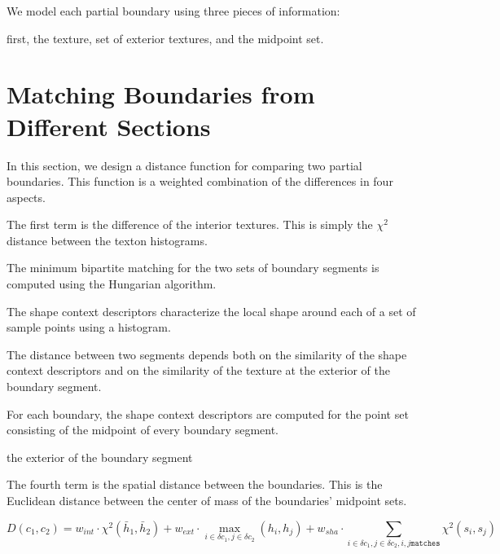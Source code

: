 \documentclass{llncs}
\begin{document}
We model each partial boundary using three pieces of information: 
\begin{itemize}
first, the texture, set of exterior textures, and the midpoint set.

\end{itemize}



\section{Matching Boundaries from Different Sections}

In this section, we design a distance function for comparing two partial boundaries. This function is a weighted combination of the differences in four aspects.

The first term is the difference of the interior textures. This is simply the $\chi^2$ distance between the texton histograms.

The minimum bipartite matching for the two sets of boundary segments is computed using the Hungarian algorithm.

The shape context descriptors characterize the local shape around each of a set of sample points using a histogram.


The distance between two segments depends both on the similarity of the shape context descriptors and on the similarity of the texture at the exterior of the boundary segment.

For each boundary, the shape context descriptors are computed for the point set consisting of the midpoint of every boundary segment.


the exterior of the boundary segment

The fourth term is the spatial distance between the boundaries. This is the Euclidean distance between the center of mass of the boundaries' midpoint sets.




$$D(c_1, c_2) = w_{int} \cdot \chi^2(\bar{h}_1, \bar{h}_2) + 
w_{ext} \cdot \max_{i \in \delta c_1, j\in \delta c_2}(h_i, h_j) +
w_{sha} \cdot \sum_{i \in \delta c_1, j \in \delta c_2, i, j \mathtt{matches}} \chi^2(s_i, s_j)
$$
\end{document}
